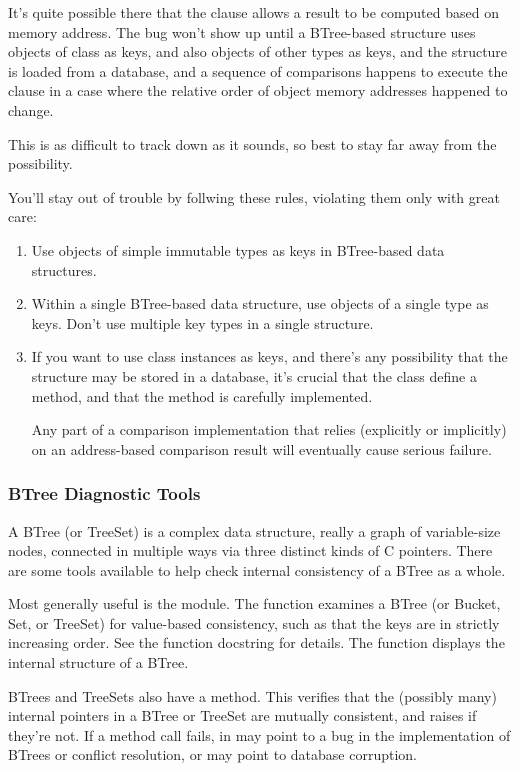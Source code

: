 It's quite possible there that the  clause allows
a result to be computed based on memory address.  The bug won't show
up until a BTree-based structure uses objects of class  as
keys, and also objects of other types as keys, and the structure is
loaded from a database, and a sequence of comparisons happens to execute
the  clause in a case where the relative order of object
memory addresses happened to change.

This is as difficult to track down as it sounds, so best to stay far
away from the possibility.

You'll stay out of trouble by follwing these rules, violating them
only with great care:

\begin{enumerate}
\item  Use objects of simple immutable types as keys in
       BTree-based data structures.

\item  Within a single BTree-based data structure, use objects of
       a single type as keys.  Don't use multiple key types in a
       single structure.

\item  If you want to use class instances as keys, and there's
       any possibility that the structure may be stored in a
       database, it's crucial that the class define a
        method, and that the method is
       carefully implemented.

       Any part of a comparison implementation that relies (explicitly
       or implicitly) on an address-based comparison result will
       eventually cause serious failure.
\end{enumerate}


\subsubsection{BTree Diagnostic Tools}

A BTree (or TreeSet) is a complex data structure, really a graph of
variable-size nodes, connected in multiple ways via three distinct kinds
of C pointers.  There are some tools available to help check internal
consistency of a BTree as a whole.

Most generally useful is the  module.  The
 function examines a BTree (or Bucket, Set, or
TreeSet) for value-based consistency, such as that the keys are in
strictly increasing order.  See the function docstring for details.
The  function displays the internal structure
of a BTree.

BTrees and TreeSets also have a  method.  This verifies
that the (possibly many) internal pointers in a BTree or TreeSet
are mutually consistent, and raises  if they're
not.  If a  method call fails, in may point to a bug
in the implementation of BTrees or conflict resolution, or may point to
database corruption.
